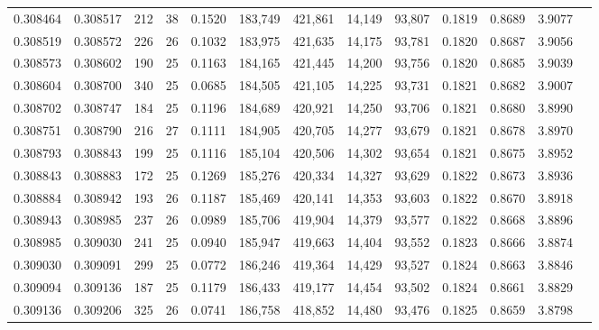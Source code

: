 \begin{tabular}{rrrrrrrrrrrrr}
0.308464 & 0.308517 &   212 &  38 &                                     0.1520 & 183,749 & 421,861 &  14,149 &  93,807 & 0.1819 & 0.8689 & 3.9077 \\
0.308519 & 0.308572 &   226 &  26 &                                     0.1032 & 183,975 & 421,635 &  14,175 &  93,781 & 0.1820 & 0.8687 & 3.9056 \\
0.308573 & 0.308602 &   190 &  25 &                                     0.1163 & 184,165 & 421,445 &  14,200 &  93,756 & 0.1820 & 0.8685 & 3.9039 \\
0.308604 & 0.308700 &   340 &  25 &                                     0.0685 & 184,505 & 421,105 &  14,225 &  93,731 & 0.1821 & 0.8682 & 3.9007 \\
0.308702 & 0.308747 &   184 &  25 &                                     0.1196 & 184,689 & 420,921 &  14,250 &  93,706 & 0.1821 & 0.8680 & 3.8990 \\
0.308751 & 0.308790 &   216 &  27 &                                     0.1111 & 184,905 & 420,705 &  14,277 &  93,679 & 0.1821 & 0.8678 & 3.8970 \\
0.308793 & 0.308843 &   199 &  25 &                                     0.1116 & 185,104 & 420,506 &  14,302 &  93,654 & 0.1821 & 0.8675 & 3.8952 \\
0.308843 & 0.308883 &   172 &  25 &                                     0.1269 & 185,276 & 420,334 &  14,327 &  93,629 & 0.1822 & 0.8673 & 3.8936 \\
0.308884 & 0.308942 &   193 &  26 &                                     0.1187 & 185,469 & 420,141 &  14,353 &  93,603 & 0.1822 & 0.8670 & 3.8918 \\
0.308943 & 0.308985 &   237 &  26 &                                     0.0989 & 185,706 & 419,904 &  14,379 &  93,577 & 0.1822 & 0.8668 & 3.8896 \\
0.308985 & 0.309030 &   241 &  25 &                                     0.0940 & 185,947 & 419,663 &  14,404 &  93,552 & 0.1823 & 0.8666 & 3.8874 \\
0.309030 & 0.309091 &   299 &  25 &                                     0.0772 & 186,246 & 419,364 &  14,429 &  93,527 & 0.1824 & 0.8663 & 3.8846 \\
0.309094 & 0.309136 &   187 &  25 &                                     0.1179 & 186,433 & 419,177 &  14,454 &  93,502 & 0.1824 & 0.8661 & 3.8829 \\
0.309136 & 0.309206 &   325 &  26 &                                     0.0741 & 186,758 & 418,852 &  14,480 &  93,476 & 0.1825 & 0.8659 & 3.8798 \\

\end{tabular}
